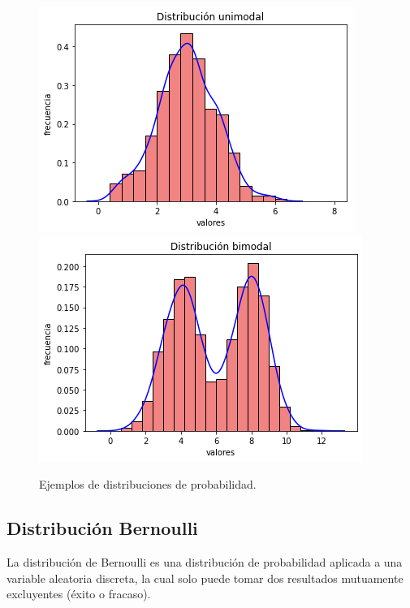 \documentclass[oneside,openright,titlepage,numbers=noenddot,openany,headinclude,footinclude=true,
cleardoublepage=empty,abstractoff,BCOR=5mm,paper=a4,fontsize=12pt,main=spanish]{scrreprt}
\begin{document}
\begin{figure}[h]
      \includegraphics[width=\linewidth]{images/unimodal.png}
    \endminipage\hfill
      \includegraphics[width=\linewidth]{images/bimodal.png}
    \endminipage
     \caption{Ejemplos de distribuciones de probabilidad.}
\end{figure}

\subsection{Distribución Bernoulli}

La distribución de Bernoulli es una distribución de probabilidad aplicada a una variable aleatoria discreta, la cual solo puede tomar dos resultados mutuamente excluyentes (éxito o fracaso).\\
\end{document}
